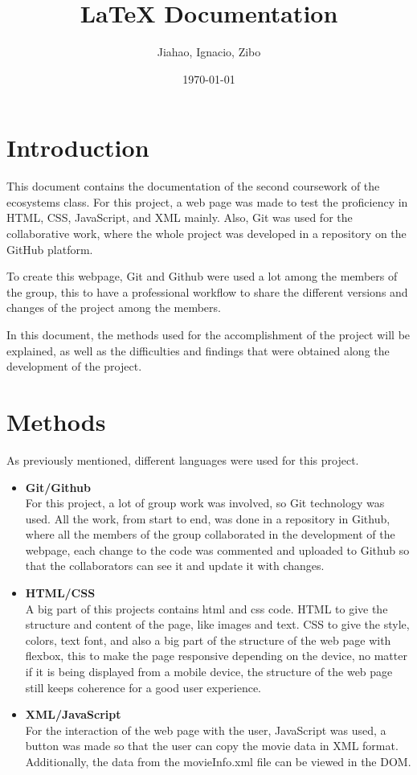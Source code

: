 \documentclass{article}
\title{LaTeX Documentation}
\author{Jiahao, Ignacio, Zibo}
\date{\today}
\begin{document}
\maketitle

\section{Introduction}

This document contains the documentation of the second coursework of the ecosystems class. For this project, a web page was made to test the proficiency in HTML, CSS, JavaScript, and XML mainly. Also, Git was used for the collaborative work, where the whole project was developed in a repository on the GitHub platform.

To create this webpage, Git and Github were used a lot among the members of the group, this to have a professional workflow to share the different versions and changes of the project among the members.

In this document, the methods used for the accomplishment of the project will be explained, as well as the difficulties and findings that were obtained along the development of the project.


\section{Methods}

As previously mentioned, different languages were used for this project.

\begin{itemize}
  \item \textbf{Git/Github} \\
  For this project, a lot of group work was involved, so Git technology was used. All the work, from start to end, was done in a repository in Github, where all the members of the group collaborated in the development of the webpage, each change to the code was commented and uploaded to Github so that the collaborators can see it and update it with changes.

  \item \textbf{HTML/CSS} \\
  A big part of this projects contains html and css code. HTML to give the structure and content of the page, like images and text. CSS to give the style, colors, text font, and also a big part of the structure of the web page with flexbox, this to make the page responsive depending on the device, no matter if it is being displayed from a mobile device, the structure of the web page still keeps coherence for a good user experience.

  \item \textbf{XML/JavaScript} \\
  For the interaction of the web page with the user, JavaScript was used, a button was made so that the user can copy the movie data in XML format. Additionally, the data from the movieInfo.xml file can be viewed in the DOM.

\end{itemize}
\end{document}
